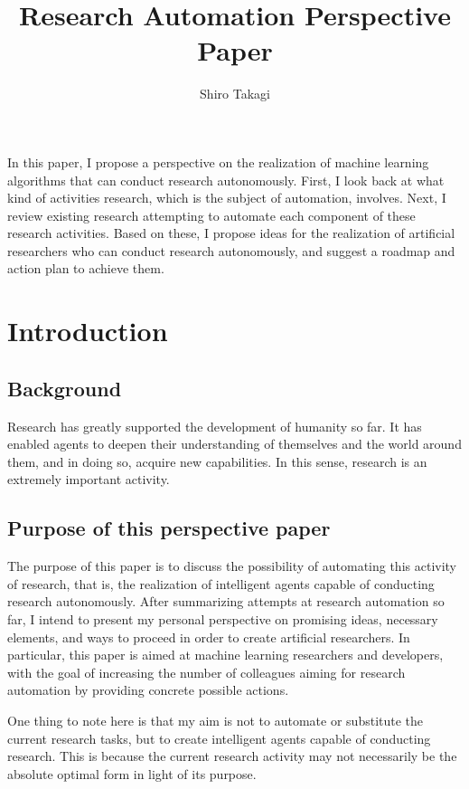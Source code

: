 \documentclass{book}
\title{Research Automation Perspective Paper}
\author{Shiro Takagi}
\newenvironment{abstract}{}{}
\begin{document}
\sloppy
\maketitle
\tableofcontents

\begin{abstract}
    In this paper, I propose a perspective on the realization of machine learning algorithms that can conduct research autonomously. First, I look back at what kind of activities research, which is the subject of automation, involves. Next, I review existing research attempting to automate each component of these research activities. Based on these, I propose ideas for the realization of artificial researchers who can conduct research autonomously, and suggest a roadmap and action plan to achieve them.
\end{abstract}

\chapter{Introduction}

\section{Background}
Research has greatly supported the development of humanity so far. It has enabled agents to deepen their understanding of themselves and the world around them, and in doing so, acquire new capabilities. In this sense, research is an extremely important activity.

\section{Purpose of this perspective paper}

The purpose of this paper is to discuss the possibility of automating this activity of research, that is, the realization of intelligent agents capable of conducting research autonomously. After summarizing attempts at research automation so far, I intend to present my personal perspective on promising ideas, necessary elements, and ways to proceed in order to create artificial researchers. In particular, this paper is aimed at machine learning researchers and developers, with the goal of increasing the number of colleagues aiming for research automation by providing concrete possible actions.

One thing to note here is that my aim is not to automate or substitute the current research tasks, but to create intelligent agents capable of conducting research. This is because the current research activity may not necessarily be the absolute optimal form in light of its purpose. 
\end{document}
